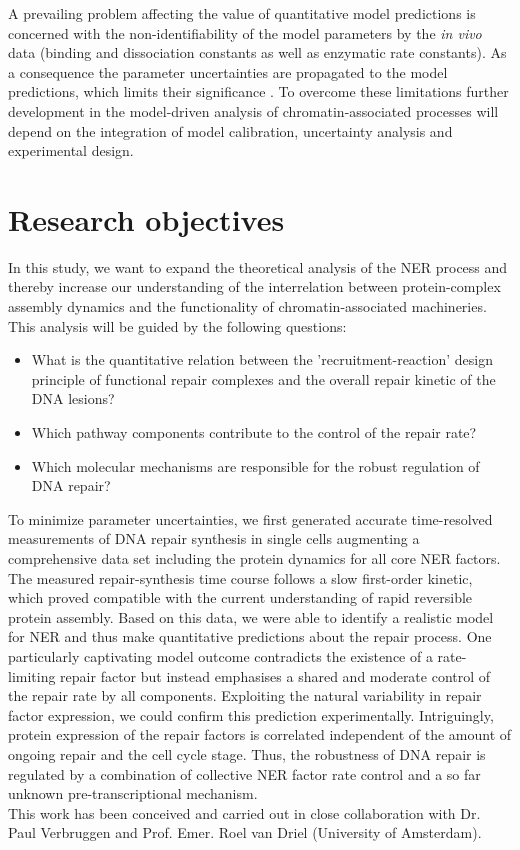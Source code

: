 A prevailing problem affecting the value of quantitative model predictions is concerned with the non-identifiability of the model parameters by the \textit{in vivo} data (binding and dissociation constants as well as enzymatic rate constants). As a consequence the parameter uncertainties are propagated to the model predictions, which limits their significance \cite{Raue2013}. To overcome these limitations further development in the model-driven analysis of chromatin-associated processes will depend on the integration of model calibration, uncertainty analysis and experimental design.     
  

\section{Research objectives}

In this study, we want to expand the theoretical analysis of the NER process and thereby increase our understanding of the interrelation between protein-complex assembly dynamics and the functionality of chromatin-associated machineries. This analysis will be guided by the following questions:

\begin{itemize}
	\item What is the quantitative relation between the 'recruitment-reaction' design principle of functional repair complexes and the overall repair kinetic of the DNA lesions?
	
	\item Which pathway components contribute to the control of the repair rate? 
	
	\item Which molecular mechanisms are responsible for the robust regulation of DNA repair? 
\end{itemize} 

To minimize parameter uncertainties, we first generated accurate time-resolved measurements of DNA repair synthesis in single cells augmenting a comprehensive data set including the protein dynamics for all core NER factors. The measured repair-synthesis time course follows a slow first-order kinetic, which proved compatible with the current understanding of rapid reversible protein assembly. Based on this data, we were able to identify a realistic model for NER and thus make quantitative predictions about the repair process. One particularly captivating model outcome contradicts the existence of a rate-limiting repair factor but instead emphasises a shared and moderate control of the repair rate by all components. Exploiting the natural variability in repair factor expression, we could confirm this prediction experimentally. Intriguingly, protein expression of the repair factors is correlated independent of the amount of ongoing repair and the cell cycle stage. Thus, the robustness of DNA repair is regulated by a combination of collective NER factor rate control and a so far unknown pre-transcriptional mechanism.\\   

This work has been conceived and carried out in close collaboration with Dr. Paul Verbruggen and Prof. Emer. Roel van Driel (University of Amsterdam).





